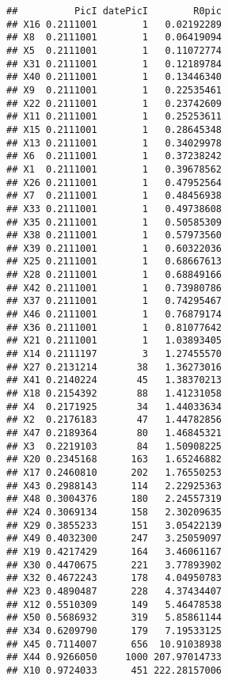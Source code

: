 \documentclass[
]{article}
\begin{document}
\begin{verbatim}
##          PicI datePicI        R0pic
## X16 0.2111001        1   0.02192289
## X8  0.2111001        1   0.06419094
## X5  0.2111001        1   0.11072774
## X31 0.2111001        1   0.12189784
## X40 0.2111001        1   0.13446340
## X9  0.2111001        1   0.22535461
## X22 0.2111001        1   0.23742609
## X11 0.2111001        1   0.25253611
## X15 0.2111001        1   0.28645348
## X13 0.2111001        1   0.34029978
## X6  0.2111001        1   0.37238242
## X1  0.2111001        1   0.39678562
## X26 0.2111001        1   0.47952564
## X7  0.2111001        1   0.48456938
## X33 0.2111001        1   0.49738608
## X35 0.2111001        1   0.50585309
## X38 0.2111001        1   0.57973560
## X39 0.2111001        1   0.60322036
## X25 0.2111001        1   0.68667613
## X28 0.2111001        1   0.68849166
## X42 0.2111001        1   0.73980786
## X37 0.2111001        1   0.74295467
## X46 0.2111001        1   0.76879174
## X36 0.2111001        1   0.81077642
## X21 0.2111001        1   1.03893405
## X14 0.2111197        3   1.27455570
## X27 0.2131214       38   1.36273016
## X41 0.2140224       45   1.38370213
## X18 0.2154392       88   1.41231058
## X4  0.2171925       34   1.44033634
## X2  0.2176183       47   1.44782856
## X47 0.2189364       80   1.46845321
## X3  0.2219103       84   1.50908225
## X20 0.2345168      163   1.65246882
## X17 0.2460810      202   1.76550253
## X43 0.2988143      114   2.22925363
## X48 0.3004376      180   2.24557319
## X24 0.3069134      158   2.30209635
## X29 0.3855233      151   3.05422139
## X49 0.4032300      247   3.25059097
## X19 0.4217429      164   3.46061167
## X30 0.4470675      221   3.77893902
## X32 0.4672243      178   4.04950783
## X23 0.4890487      228   4.37434407
## X12 0.5510309      149   5.46478538
## X50 0.5686932      319   5.85861144
## X34 0.6209790      179   7.19533125
## X45 0.7114007      656  10.91038938
## X44 0.9266050     1000 207.97014733
## X10 0.9724033      451 222.28157006
\end{verbatim}
\end{document}
